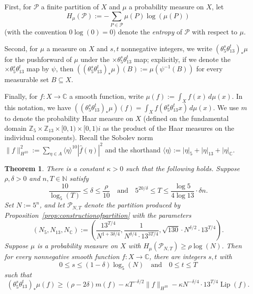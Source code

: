 \documentclass[11pt]{amsart}
\newtheorem{theorem}[lemma]{Theorem}
\theoremstyle{definition}
\newcommand{\C}{{\mathbb C}}
\newcommand{\Z}{{\mathbb Z}}
\DeclareMathOperator{\Lip}{Lip}
\begin{document}
First, for $\mathcal{P}$ a finite partition of $X$ and $\mu$ a probability measure on $X$, let $$H_{\mu}(\mathcal{P}):=-\sum_{P \in \mathcal{P}}\mu(P) \log(\mu(P))$$ (with the convention $0 \log(0)=0$) denote the \emph{entropy} of $\mathcal{P}$ with respect to $\mu$.

Second, for $\mu$ a measure on $X$ and $s,t$ nonnegative integers, we write $(\theta_5^s \theta_{13}^t)_*\mu$ for the pushforward of $\mu$ under the $\times \theta_5^s \theta_{13}^t$ map; explicitly, if we denote the $\times \theta_5^s \theta_{13}^t$ map by $\psi$, then $((\theta_5^s \theta_{13}^t)_*\mu)(B):=\mu(\psi^{-1}(B))$ for every measurable set $B \subseteq X$.

Finally, for $f: X \to \C$ a smooth function, write $\mu(f):=\int_X f(x) \,d\mu(x)$.  In this notation, we have $((\theta_5^s \theta_{13}^t)_*\mu)(f)=\int_X f(\theta_5^s \theta_{13}^t x) \, d\mu(x)$.  We use $m$ to denote the probability Haar measure on $X$ (defined on the fundamental domain $\Z_5 \times \Z_{13} \times [0,1) \times [0,1)i$ as the product of the Haar measures on the individual components). Recall the Sobolev norm $\|f\|_{H^{10}}^2:=\sum_{\eta \in A} \langle \eta \rangle^{10} |\widehat{f}(\eta)|^2$ and the shorthand $\langle \eta \rangle:=|\eta|_5+|\eta|_{13}+|\eta|_\mathbb{C}$.


\begin{theorem}\label{thm:entropyweirdpartition}
There is a constant $\kappa>0$ such that the following holds.
Suppose $\rho, \delta>0$ and $n,T \in \mathbb{N}$ satisfy
$$\frac{10}{\log_5(T)} \leq\delta \leq \frac{\rho}{10} \quad \text{and} \quad 5^{20/\delta} \leq T \leq \frac{\log 5}{4\log 13}\cdot \delta n.$$
Set $N:=5^n$, and let $\mathcal{P}_{N,T}$ denote the partition produced by Proposition~\ref{prop:constructionofpartition} with the parameters $$(N_5,N_{13},N_{\C}):=\left(\frac{13^{T/4}}{N^{1+3\delta/4}}, \frac{1}{N^{\delta/4} \cdot 13^{3T/4}}, \sqrt{130} \cdot N^{\delta/2} \cdot 13^{T/4}  \right).$$
Suppose $\mu$ is a probability measure on $X$ with $H_{\mu}(\mathcal{P}_{N,T})\geq \rho \log(N)$.  Then for every nonnegative smooth function $f: X \to \C$, there are integers $s,t$ with $$0 \le s \le (1 - \delta)\log_5(N) \quad \text{and} \quad 0 \le t \le T$$ such that
$$(\theta_5^s \theta_{13}^t)_*\mu(f) \ge \left(\rho - 2\delta\right)m(f) - \kappa T^{-\delta/2}\|f\|_{H^{10}}-\kappa N^{-\delta/4} \cdot 13^{T/4} \Lip(f).$$
%
\end{theorem}
\end{document}
